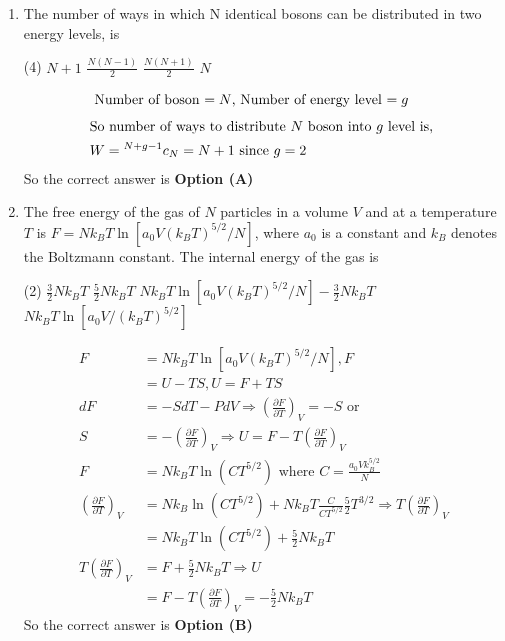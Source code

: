 \begin{enumerate}
\item The number of ways in which $\mathrm{N}$ identical bosons can be distributed in two energy levels, is
{}
\begin{tasks}(4)
\task[\textbf{A.}] $N+1$
\task[\textbf{B.}] $\frac{N(N-1)}{2}$
\task[\textbf{C.}] $\frac{N(N+1)}{2}$
\task[\textbf{D.}] $N$
\end{tasks}
\begin{answer}
\begin{align*}
\intertext{	Number of boson $=N$, Number of energy level $=g$}
\intertext{So number of ways to distribute $N$ boson into $g$ level is, }
W&={ }^{N+g-1} c_{N}=N+1\text{ since }g=2
\end{align*}
So the correct answer is \textbf{Option (A)}
\end{answer}
\item The free energy of the gas of $N$ particles in a volume $V$ and at a temperature $T$ is $F=N k_{B} T \ln \left[a_{0} V\left(k_{B} T\right)^{5 / 2} / N\right]$, where $a_{0}$ is a constant and $k_{B}$ denotes the Boltzmann constant. The internal energy of the gas is
{}

\begin{tasks}(2)
\task[\textbf{A.}] $\frac{3}{2} N k_{B} T$
\task[\textbf{B.}] $\frac{5}{2} N k_{B} T$
\task[\textbf{C.}] $N k_{B} T \ln \left[a_{0} V\left(k_{B} T\right)^{5 / 2} / N\right]-\frac{3}{2} N k_{B} T$
\task[\textbf{D.}] $N k_{B} T \ln \left[a_{0} V /\left(k_{B} T\right)^{5 / 2}\right]$
\end{tasks}
\begin{answer}
\begin{align*}
F&=N k_{B} T \ln \left[a_{0} V\left(k_{B} T\right)^{5 / 2} / N\right], F\\&=U-T S, U=F+T S\\
d F&=-S d T-P d V \Rightarrow\left(\frac{\partial F}{\partial T}\right)_{V}=-S \text{ or } \\S&=-\left(\frac{\partial F}{\partial T}\right)_{V} \Rightarrow U=F-T\left(\frac{\partial F}{\partial T}\right)_{V}\\
F&=N k_{B} T \ln \left(C T^{5 / 2}\right)\text{ where }C=\frac{a_{0} V k_{B}^{5 / 2}}{N}\\
\left(\frac{\partial F}{\partial T}\right)_{V}&=N k_{B} \ln \left(C T^{5 / 2}\right)+N k_{B} T \frac{C}{C T^{5 / 2}} \frac{5}{2} T^{3 / 2} \Rightarrow T\left(\frac{\partial F}{\partial T}\right)_{V}\\&=N k_{B} T \ln \left(C T^{5 / 2}\right)+\frac{5}{2} N k_{B} T\\
T\left(\frac{\partial F}{\partial T}\right)_{V}&=F+\frac{5}{2} N k_{B} T \Rightarrow U\\&=F-T\left(\frac{\partial F}{\partial T}\right)_{V}=-\frac{5}{2} N k_{B} T
\end{align*}
So the correct answer is \textbf{Option (B)}
\end{answer}


\end{enumerate}
